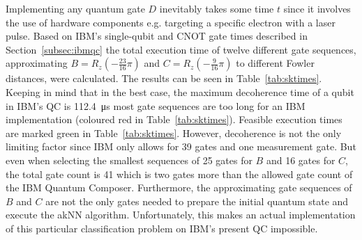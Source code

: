 Implementing any quantum gate $D$ inevitably takes some time $t$ since it involves the use of hardware components e.g. targeting a specific electron with a laser pulse. Based on IBM's single-qubit and CNOT gate times described in Section~\ref{subsec:ibmqc} the total execution time of twelve different gate sequences, approximating $B = R_z(-\frac{23}{16}\pi)$ and $C = R_z(-\frac{9}{16}\pi)$ to different Fowler distances, were calculated. The results can be seen in Table~\ref{tab:sktimes}. Keeping in mind that in the best case, the maximum decoherence time of a qubit in IBM's QC is \SI{112.4}{\micro\second} most gate sequences are too long for an IBM implementation (coloured red in Table~\ref{tab:sktimes}). Feasible execution times are marked green in Table~\ref{tab:sktimes}. However, decoherence is not the only limiting factor since IBM only allows for 39 gates and one measurement gate. But even when selecting the smallest sequences of 25 gates for $B$ and 16 gates for $C$, the total gate count is 41 which is two gates more than the allowed gate count of the IBM Quantum Composer. Furthermore, the approximating gate sequences of $B$ and $C$ are not the only gates needed to prepare the initial quantum state and execute the akNN algorithm. Unfortunately, this makes an actual implementation of this particular classification problem on IBM's present QC impossible.



